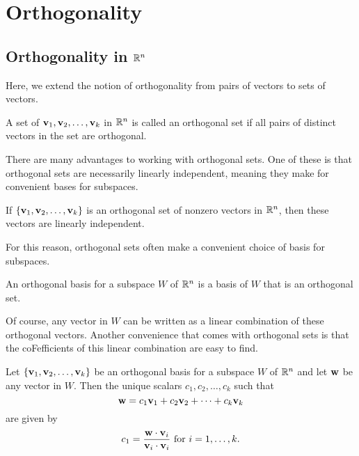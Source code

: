 \documentclass[../m073main.tex]{subfiles}
\begin{document}
\chapter{Orthogonality}
\section{Orthogonality in $\mathbb{R}^n$}
Here, we extend the notion of orthogonality from pairs of vectors to sets of vectors.

\begin{definition}
	A set of $\mathbf{v}_1, \mathbf{v}_2, \ldots, \mathbf{v}_k$ in $\mathbb{R}^n$ is called an orthogonal set if all pairs of distinct vectors in the set are orthogonal. 
\end{definition}

There are many advantages to working with orthogonal sets.
One of these is that orthogonal sets are necessarily linearly independent, meaning they make for convenient bases for subspaces.

\begin{theorem}
	If $\{\mathbf{v}_1, \mathbf{v}_2, \ldots, \mathbf{v}_k\}$ is an orthogonal set of nonzero vectors in $\mathbb{R}^n$, then these vectors are linearly independent.
\end{theorem}

For this reason, orthogonal sets often make a convenient choice of basis for subspaces.

\begin{definition}
	An orthogonal basis for a subspace $W$ of $\mathbb{R}^n$ is a basis of $W$ that is an orthogonal set.
\end{definition}

Of course, any vector in $W$ can be written as a linear combination of these orthogonal vectors.
Another convenience that comes with orthogonal sets is that the coFefficients of this linear combination are easy to find.

\begin{theorem}
	Let $\{\mathbf{v}_1, \mathbf{v}_2, \ldots, \mathbf{v}_k\}$ be an orthogonal basis for a subspace $W$ of $\mathbb{R}^n$ and let $\mathbf{w}$ be any vector in $W$.
	Then the unique scalars $c_1, c_2, \ldots, c_k$ such that
	\[ \mathbf{w} = c_1 \mathbf{v}_1 + c_2 \mathbf{v}_2 + \cdots + c_k \mathbf{v}_k \]
	are given by
	\[ c_1 = \frac{\mathbf{w} \cdot \mathbf{v}_i}{\mathbf{v}_i \cdot \mathbf{v}_i} \text{ for } i = 1, \ldots, k. \]
\end{theorem}
\end{document}
